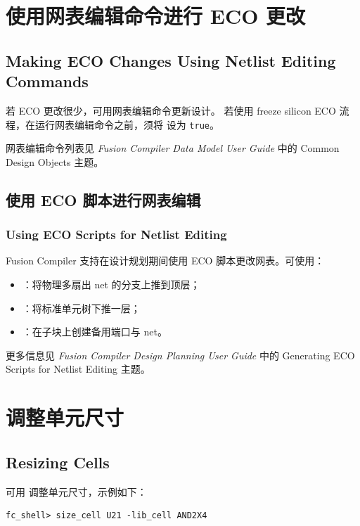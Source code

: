 \section{使用网表编辑命令进行 ECO 更改}
\subsection*{Making ECO Changes Using Netlist Editing Commands}

若 ECO 更改很少，可用网表编辑命令更新设计。
若使用 freeze silicon ECO 流程，在运行网表编辑命令之前，须将  设为 \texttt{true}。

网表编辑命令列表见 \textit{Fusion Compiler Data Model User Guide} 中的 Common Design Objects 主题。

\subsection{使用 ECO 脚本进行网表编辑}
\subsubsection*{Using ECO Scripts for Netlist Editing}

Fusion Compiler 支持在设计规划期间使用 ECO 脚本更改网表。可使用：
\begin{itemize}
  \item {}：将物理多扇出 net 的分支上推到顶层；
  \item {}：将标准单元树下推一层；
  \item {}：在子块上创建备用端口与 net。
\end{itemize}

更多信息见 \textit{Fusion Compiler Design Planning User Guide} 中的 Generating ECO Scripts for Netlist Editing 主题。

\section{调整单元尺寸}
\subsection*{Resizing Cells}

可用  调整单元尺寸，示例如下：
\begin{lstlisting}
fc_shell> size_cell U21 -lib_cell AND2X4
\end{lstlisting}

